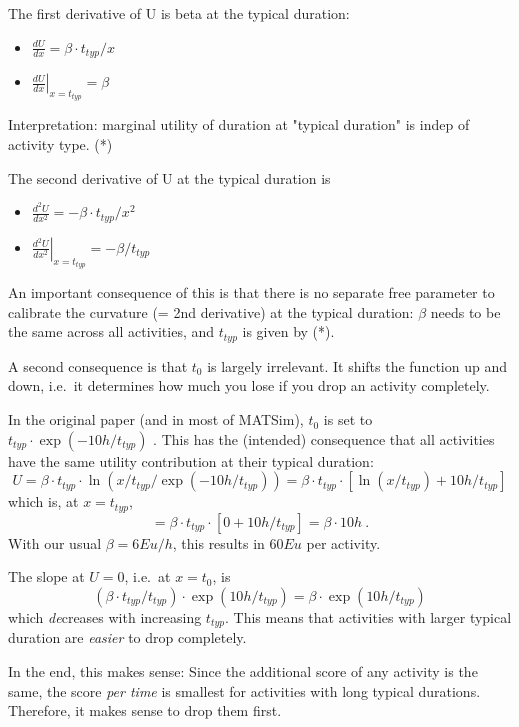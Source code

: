 The first derivative of U is beta at the typical duration:
\begin{itemize}
	\item 
$\displaystyle
\frac{dU}{dx} = \beta \cdot t_{typ} / x
$
	\item 
$\displaystyle
\left. \frac{dU}{dx}\right|_{x=t_{typ}} = \beta
$
\end{itemize}

Interpretation: marginal utility of duration at "typical duration" is indep of activity type. (*)

The second derivative of U at the typical duration is
\begin{itemize}
	\item 
$\displaystyle
\frac{d^2U}{dx^2} = - \beta \cdot t_{typ} / x^2
$
	\item 
$\displaystyle
\left. \frac{d^2U}{dx^2} \right|_{x=t_{typ}} = - \beta / t_{typ}
$
\end{itemize}

An  important consequence of this is that there is no separate  free  parameter to calibrate the curvature (= 2nd derivative) at the  typical  duration: $\beta$ needs to be the same across all activities, and  $t_{typ}$ is  given by (*).

A second consequence is that $t_0$ is largely  irrelevant. It  shifts the function up and down, i.e.\ it determines how  much you lose  if you drop an activity completely.

In the  original paper (and in most of MATSim), $t_0$ is set to $t_{typ} \cdot   \exp(-10h/t_{typ})$ . This has the (intended) consequence that all  activities  have the same utility contribution at their typical  duration:
\[
U = \beta \cdot t_{typ} \cdot \ln( x / t_{typ} / \exp(-10h/t_{typ}) ) 
%
= \beta \cdot t_{typ} \cdot [ \ln( x/t_{typ} ) + 10h/t_{typ} ]
\]
which   is, at $x=t_{typ}$,
\[
= \beta \cdot t_{typ} \cdot [ 0 + 10h/t_{typ} ] = \beta \cdot  10h \ . 
\]
With  our usual $\beta = 6Eu/h$, this results in $60Eu$ per  activity.

The slope at $U=0$, i.e.\ at $x=t_0$, is
\[
(\beta \cdot t_{typ} / t_{typ}) \cdot \exp( 10h/t_{typ}) = \beta \cdot \exp( 10h/t_{typ} )
\]
which \emph{de}creases with increasing $t_{typ}$. This means that activities with larger typical duration are \emph{easier} to drop completely.

In the end, this makes sense: Since the additional score of any activity is the same, the score \emph{per time} is smallest for activities with long typical durations. Therefore, it makes sense to drop them first.

